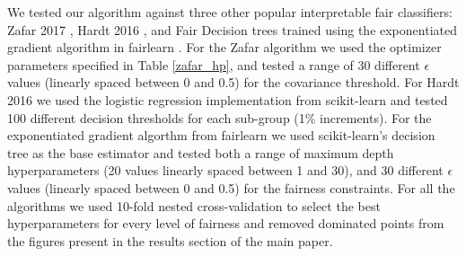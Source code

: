 \documentclass[twoside,11pt]{article}
\begin{document}
We tested our algorithm against three other popular interpretable fair classifiers: Zafar 2017 \citep{Zafar_2017}, Hardt 2016 \citep{hardt2016equality}, and Fair Decision trees trained using the exponentiated gradient algorithm in fairlearn \citep{agarwal2018reductions}. For the Zafar algorithm we used the optimizer parameters specified in Table \ref{zafar_hp}, and tested a range of 30 different $\epsilon$ values (linearly spaced between 0 and 0.5) for the covariance threshold. For Hardt 2016 we used the logistic regression implementation from scikit-learn \citep{scikit-learn} and tested 100 different decision thresholds for each sub-group (1\% increments). For the exponentiated gradient algorthm from fairlearn we used scikit-learn's decision tree as the base estimator and tested both a range of maximum depth hyperparameters (20 values linearly spaced between 1 and 30), and 30 different $\epsilon$ values (linearly spaced between 0 and 0.5) for the fairness constraints. For all the algorithms we used 10-fold nested cross-validation to select the best hyperparameters for every level of fairness and removed dominated points from the figures present in the results section of the main paper.
\end{document}
